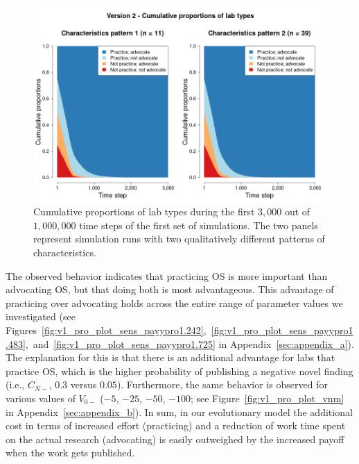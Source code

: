 \documentclass[meta, authordate]{jote-new-article}
\begin{document}
\begin{figure}[!t]
  \begin{fullwidth}

    \centering
    \includegraphics[width=\textwidth]{v2_pro_plot_main.png}
    \caption{Cumulative proportions of lab types during the first $3,000$ out of $1,000,000$ time steps of the first set of simulations. The two panels represent simulation runs with two qualitatively different patterns of characteristics.}
    \label{fig:v2_pro_plot_main}
  \end{fullwidth}
\end{figure}
%

The observed behavior indicates that practicing OS is more important than advocating OS, but that doing both is most advantageous. This advantage of practicing over advocating holds across the entire range of parameter values we investigated (see Figures~\ref{fig:v1_pro_plot_sens_payypro1.242},~\ref{fig:v1_pro_plot_sens_payypro1.483},~and~\ref{fig:v1_pro_plot_sens_payypro1.725} in Appendix~\ref{sec:appendix_a}). The explanation for this is that there is an additional advantage for labs that practice OS, which is the higher probability of publishing a negative novel finding (i.e., $C_{N-}$, $0.3$ versus $0.05$). Furthermore, the same behavior is observed for various values of $V_{0-}$ ($-5$, $-25$, $-50$, $-100$; see Figure~\ref{fig:v1_pro_plot_vnm} in Appendix~\ref{sec:appendix_b}). In sum, in our evolutionary model the additional cost in terms of increased effort (practicing) and a reduction of work time spent on the actual research (advocating) is easily outweighed by the increased payoff when the work gets published.
\end{document}
